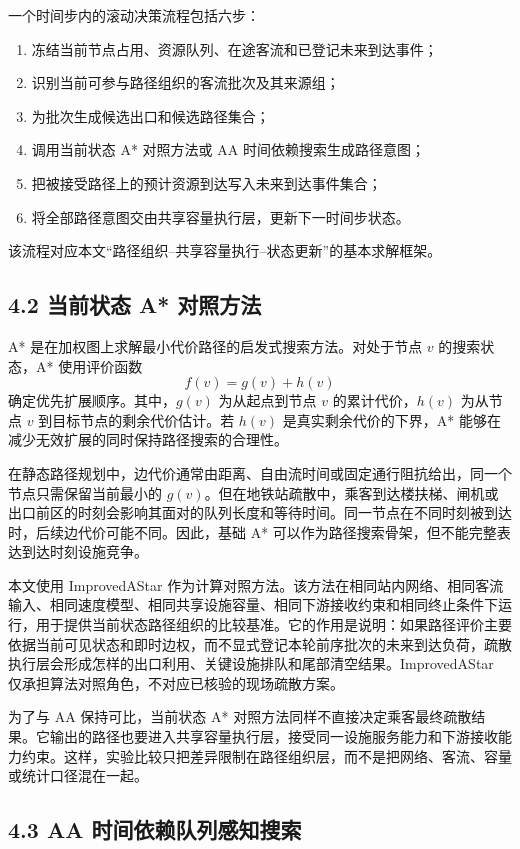 \documentclass[UTF8,a4paper,12pt]{ctexart}
\begin{document}
一个时间步内的滚动决策流程包括六步：
\begin{enumerate}
\item 冻结当前节点占用、资源队列、在途客流和已登记未来到达事件；
\item 识别当前可参与路径组织的客流批次及其来源组；
\item 为批次生成候选出口和候选路径集合；
\item 调用当前状态 A* 对照方法或 AA 时间依赖搜索生成路径意图；
\item 把被接受路径上的预计资源到达写入未来到达事件集合；
\item 将全部路径意图交由共享容量执行层，更新下一时间步状态。
\end{enumerate}
该流程对应本文“路径组织--共享容量执行--状态更新”的基本求解框架。

\subsection{4.2 当前状态 A* 对照方法}

A* 是在加权图上求解最小代价路径的启发式搜索方法。对处于节点 \(v\) 的搜索状态，A* 使用评价函数
\[
f(v)=g(v)+h(v)
\]
确定优先扩展顺序。其中，\(g(v)\) 为从起点到节点 \(v\) 的累计代价，\(h(v)\) 为从节点 \(v\) 到目标节点的剩余代价估计。若 \(h(v)\) 是真实剩余代价的下界，A* 能够在减少无效扩展的同时保持路径搜索的合理性。

在静态路径规划中，边代价通常由距离、自由流时间或固定通行阻抗给出，同一个节点只需保留当前最小的 \(g(v)\)。但在地铁站疏散中，乘客到达楼扶梯、闸机或出口前区的时刻会影响其面对的队列长度和等待时间。同一节点在不同时刻被到达时，后续边代价可能不同。因此，基础 A* 可以作为路径搜索骨架，但不能完整表达到达时刻设施竞争。

本文使用 ImprovedAStar 作为计算对照方法。该方法在相同站内网络、相同客流输入、相同速度模型、相同共享设施容量、相同下游接收约束和相同终止条件下运行，用于提供当前状态路径组织的比较基准。它的作用是说明：如果路径评价主要依据当前可见状态和即时边权，而不显式登记本轮前序批次的未来到达负荷，疏散执行层会形成怎样的出口利用、关键设施排队和尾部清空结果。ImprovedAStar 仅承担算法对照角色，不对应已核验的现场疏散方案。

为了与 AA 保持可比，当前状态 A* 对照方法同样不直接决定乘客最终疏散结果。它输出的路径也要进入共享容量执行层，接受同一设施服务能力和下游接收能力约束。这样，实验比较只把差异限制在路径组织层，而不是把网络、客流、容量或统计口径混在一起。

\subsection{4.3 AA 时间依赖队列感知搜索}
\end{document}
